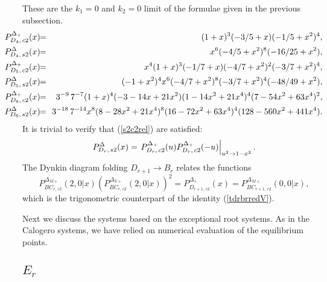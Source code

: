 \documentclass[a4paper,12pt]{article}
\newcommand{\vT}{\vphantom{\mbox{\twozero I}}}
\begin{document}
These are the $k_1=0$ and $k_2=0$ limit of the formulae given in the
previous subsection.
\begin{eqnarray}
   \hspace{-9mm}P_{D_{4},\,c2}^{{\Delta}_+}(x)&\!\!=\!\!&
   (1 + x)^3(-3/5 + x)(-1/5 +x^2)^4,\\
%
   \hspace{-9mm}P_{D_{4},\,s2}^{{\Delta}}(x)&\!\!=\!\!&
   x^6(-4/5 + x^2)^8(-16/25 + x^2),\\
%
   \hspace{-9mm}P_{D_{5},\,c2}^{{\Delta}_+}(x)&\!\!=\!\!&
   x^4(1 + x)^3(-1/7 + x)(-4/7 + x^2)^2(-3/7 + x^2)^4,\\
%
   \hspace{-9mm}P_{D_{5},\,s2}^{{\Delta}}(x)&\!\!=\!\!&
   (-1 + x^2)^4x^6(-4/7 + x^2)^8(-3/7 + x^2)^4(-48/49 + x^2),\\
%
   \hspace{-9mm}P_{D_{6},\,c2}^{{\Delta}_+}(x)&\!\!=\!\!&3^{-9}\,7^{-7}
   (1 + x)^4(-3 - 14x + 21x^2)(1 - 14x^2 + 21x^4)^4 (7 - 54x^2 + 63x^4)^2,\\
%
   \hspace{-9mm}P_{D_{6},\,s2}^{{\Delta}}(x)&\!\!=\!\!&3^{-18}\,7^{-14}
   x^8(8 - 28x^2 + 21x^4)^8(16 - 72x^2 + 63x^4)^4 (128 - 560x^2 + 441x^4).
\end{eqnarray}
It is trivial to verify that (\ref{s2c2rel}) are satisfied:
\begin{equation}
   P_{D_r,\,s2}^{{\Delta}}(x)
   =\left.\vT P_{D_r,\,c2}^{{\Delta}_+}(u)P_{D_r,\,c2}^{{\Delta}_+}(-u)
   \right|_{u^2\to1-x^2}.
\end{equation}
The Dynkin diagram folding $D_{r+1}\to B_r$ relates the functions
\begin{equation}
   P_{BC_{r,\,c2}}^{\Delta_{M+}}(2,0|x)
   \left(P_{BC_{r,\,c2}}^{\Delta_{S+}}(2,0|x)\right)^2=
   P_{D_{r+1,\,c2}}^{\Delta_+}(x)=P_{BC_{r+1,\,c2}}^{\Delta_{M+}}(0,0|x), 
   \label{tdrbrredDel}
\end{equation}
which is the  trigonometric counterpart of the identity (\ref{tdrbrredV}).

\bigskip
Next we discuss the systems based on the exceptional root systems.
As in the Calogero systems, we have relied on numerical evaluation of
the equilibrium points.

\subsection{$E_r$}
\end{document}
